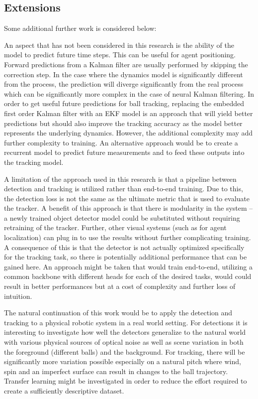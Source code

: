 \documentclass[a4paper,twoside,12pt]{report}
\begin{document}
\subsection{Extensions}

Some additional further work is considered below:

An aspect that has not been considered in this research is the ability of the model to predict future time steps. This can be useful for agent positioning. Forward predictions from a Kalman filter are usually performed by skipping the correction step. In the case where the dynamics model is significantly different from the process, the prediction will diverge significantly from the real process which can be significantly more complex in the case of neural Kalman filtering. In order to get useful future predictions for ball tracking, replacing the embedded first order Kalman filter with an EKF model is an approach that will yield better predictions but should also improve the tracking accuracy as the model better represents the underlying dynamics. However, the additional complexity may add further complexity to training. An alternative approach would be to create a recurrent model to predict future measurements and to feed these outputs into the tracking model.

A limitation of the approach used in this research is that a pipeline between detection and tracking is utilized rather than end-to-end training. Due to this, the detection loss is not the same as the ultimate metric that is used to evaluate the tracker. A benefit of this approach is that there is modularity in the system -- a newly trained object detector model could be substituted without requiring retraining of the tracker. Further, other visual systems (such as for agent localization) can plug in to use the results without further complicating training. A consequence of this is that the detector is not actually optimized specifically for the tracking task, so there is potentially additional performance that can be gained here. An approach might be taken that would train end-to-end, utilizing a common backbone with different heads for each of the desired tasks, would could result in better performances but at a cost of complexity and further loss of intuition.

The natural continuation of this work would be to apply the detection and tracking to a physical robotic system in a real world setting. For detections it is interesting to investigate how well the detectors generalize to the natural world with various physical sources of optical noise as well as scene variation in both the foreground (different balls) and the background. For tracking, there will be significantly more variation possible especially on a natural pitch where wind, spin and an imperfect surface can result in changes to the ball trajectory. Transfer learning might be investigated in order to reduce the effort required to create a sufficiently descriptive dataset.
\end{document}
